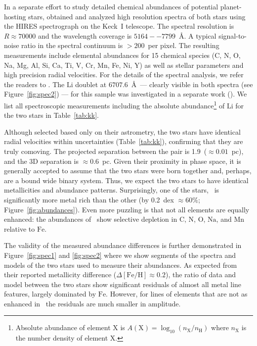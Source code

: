 \documentclass[modern, letterpaper]{aastex61}
\newcommand{\figname}{Figure}
\newcommand*\elem[1]{\ensuremath{\mathrm{#1}}}
\newcommand*\elemH[1]{\ensuremath{[\mathrm{#1}/\elem{H}]}}
\newcommand*{\feh}{\ensuremath{\elemH{Fe}}}
\newcommand{\bizarreone}{\text{Kronos}}
\begin{document}
In a separate effort to study detailed chemical abundances of potential
planet-hosting stars, \citet{2016ApJS..225...32B} obtained and analyzed high resolution
spectra of both stars using the HIRES spectrograph on the Keck~I telescope.
The spectral resolution is $R\approx 70000$ and the wavelength coverage is
$5164--7799$~\AA.
A typical signal-to-noise ratio in the spectral continuum is $>200$~per pixel.
The resulting measurements include elemental abundances for 15 chemical species
(C, N, O, Na, Mg, Al, Si, Ca, Ti, V, Cr, Mn, Fe, Ni, Y) as well as stellar parameters
and high precision radial velocities.
For the details of the spectral analysis, we refer the readers to
\citealt{2016ApJS..225...32B}.
The \elem{Li} doublet at $6707.6$~\AA\ --- clearly visible in both spectra (see
\figname~\ref{fig:spec2}) --- for this sample was investigated in a separate
work (\citealt{jmlithium}).
We list all spectroscopic measurements including
the absolute abundance\footnote{
  Absolute abundance of element \elem{X} is
  $A(\elem{X}) = \log_{10} (n_\elem{X}/n_\elem{H})$
  where $n_\elem{X}$ is the number density of element \elem{X}.
}
of \elem{Li} for the two stars in Table~\ref{tab:kk}.

Although selected based only on their astrometry, the two stars
have identical radial velocities within uncertainties (Table~\ref{tab:kk}),
confirming that they are truly comoving.
The projected separation between the pair is 1.9\arcmin\ ($\approx 0.01$~pc),
and the 3D separation is $\approx 0.6$~pc.
Given their proximity in phase space, it is generally accepted to assume that
the two stars were born together and, perhaps, are a bound wide binary system.
Thus, we expect the two stars to have identical metallicities and abundance patterns.
Surprisingly, one of the stars, \bizarreone\ is significantly more metal
rich than the other (by 0.2~dex $\approx 60\%$; \figname~\ref{fig:abundances}).
Even more puzzling is that not all elements are equally enhanced:
the abundances of \bizarreone\ show selective depletion in
\elem{C}, \elem{N}, \elem{O}, \elem{Na}, and \elem{Mn}
relative to \elem{Fe}.

The validity of the measured abundance differences is further demonstrated
in \figname~\ref{fig:spec1} and \ref{fig:spec2} where we show
segments of the spectra and models of the two stars
used to measure their abundances.
As expected from their reported metallicity difference ($\Delta\feh \approx 0.2$),
the ratio of data and model between the two stars show significant
residuals of almost all metal line features, largely dominated by \elem{Fe}.
However, for lines of elements that are not as enhanced in \bizarreone\,
the residuals are much smaller in amplitude.
\end{document}
